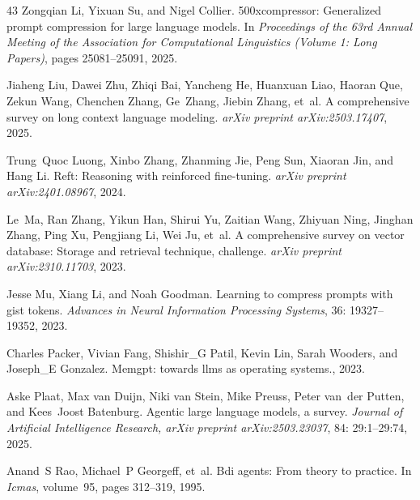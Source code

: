 \begin{thebibliography}{43}
Zongqian Li, Yixuan Su, and Nigel Collier.
\newblock 500xcompressor: Generalized prompt compression for large language models.
\newblock In \emph{Proceedings of the 63rd Annual Meeting of the Association for Computational Linguistics (Volume 1: Long Papers)}, pages 25081--25091, 2025{}.

Jiaheng Liu, Dawei Zhu, Zhiqi Bai, Yancheng He, Huanxuan Liao, Haoran Que, Zekun Wang, Chenchen Zhang, Ge~Zhang, Jiebin Zhang, et~al.
\newblock A comprehensive survey on long context language modeling.
\newblock \emph{arXiv preprint arXiv:2503.17407}, 2025.

Trung~Quoc Luong, Xinbo Zhang, Zhanming Jie, Peng Sun, Xiaoran Jin, and Hang Li.
\newblock Reft: Reasoning with reinforced fine-tuning.
\newblock \emph{arXiv preprint arXiv:2401.08967}, 2024.

Le~Ma, Ran Zhang, Yikun Han, Shirui Yu, Zaitian Wang, Zhiyuan Ning, Jinghan Zhang, Ping Xu, Pengjiang Li, Wei Ju, et~al.
\newblock A comprehensive survey on vector database: Storage and retrieval technique, challenge.
\newblock \emph{arXiv preprint arXiv:2310.11703}, 2023.

Jesse Mu, Xiang Li, and Noah Goodman.
\newblock Learning to compress prompts with gist tokens.
\newblock \emph{Advances in Neural Information Processing Systems}, 36: 19327--19352, 2023.

Charles Packer, Vivian Fang, Shishir\_G Patil, Kevin Lin, Sarah Wooders, and Joseph\_E Gonzalez.
\newblock Memgpt: towards llms as operating systems., 2023.

Aske Plaat, Max van Duijn, Niki van Stein, Mike Preuss, Peter van~der Putten, and Kees~Joost Batenburg.
\newblock Agentic large language models, a survey.
\newblock \emph{Journal of Artificial Intelligence Research, arXiv preprint arXiv:2503.23037}, 84: 29:1--29:74, 2025.

Anand~S Rao, Michael~P Georgeff, et~al.
\newblock Bdi agents: From theory to practice.
\newblock In \emph{Icmas}, volume~95, pages 312--319, 1995.


\end{thebibliography}
